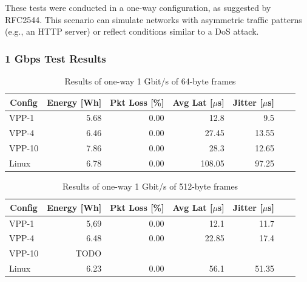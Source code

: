 These tests were conducted in a one-way configuration, as suggested by RFC2544\cite{rfc2544}.
This scenario can simulate networks with asymmetric traffic patterns (e.g., an HTTP server) or reflect conditions similar to a DoS attack.

\subsubsection{1 Gbps Test Results}

\begin{table}[h!]
\centering
\caption{Results of one-way 1 Gbit/s of 64-byte frames}
\begin{tabular}{|l|r|r|r|r|r|r|}
\hline
\multicolumn{1}{|c|}{\textbf{Config}} &
\multicolumn{1}{c|}{\textbf{Energy [Wh] }} &
\multicolumn{1}{c|}{\textbf{Pkt Loss [\%]}} &
\multicolumn{1}{c|}{\textbf{Avg Lat [$\mu$s]}} &
\multicolumn{1}{c|}{\textbf{Jitter [$\mu$s]}} \\
\hline 
VPP-1 & 5.68 & 0.00 & 12.8 & 9.5 \\
VPP-4 & 6.46 & 0.00 & 27.45 & 13.55 \\
VPP-10 & 7.86 & 0.00 & 28.3 & 12.65 \\
Linux & 6.78 & 0.00 & 108.05 & 97.25 \\
\hline
\end{tabular}
\label{tab:1udp:64B}
\end{table}


\begin{table}[h!]
\centering
\caption{Results of one-way 1 Gbit/s of 512-byte frames}
\begin{tabular}{|l|r|r|r|r|r|r|}
\hline
\multicolumn{1}{|c|}{\textbf{Config}} &
\multicolumn{1}{c|}{\textbf{Energy [Wh] }} &
\multicolumn{1}{c|}{\textbf{Pkt Loss [\%]}} &
\multicolumn{1}{c|}{\textbf{Avg Lat [$\mu$s]}} &
\multicolumn{1}{c|}{\textbf{Jitter [$\mu$s]}} \\
\hline 
VPP-1 & 5,69 & 0.00 & 12.1 & 11.7 \\
VPP-4 & 6.48 & 0.00 & 22.85 & 17.4 \\
VPP-10 & TODO &  &  &  \\
Linux & 6.23 & 0.00 & 56.1 & 51.35 \\
\hline
\end{tabular}
\label{tab:1udp:512B}
\end{table}


